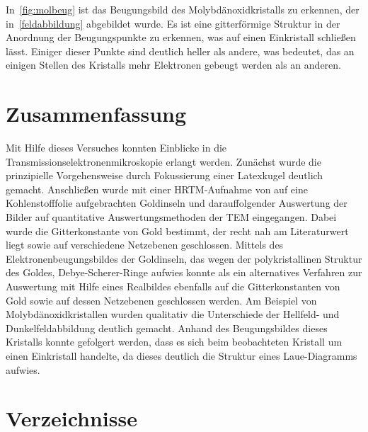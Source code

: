 \documentclass[slug=TEM, room=IFW, supervisor=?, coursedate=23.\ 01.\ 2020]{../../Lab_Report_LaTeX/lab_report}
\begin{document}
In~\ref{fig:molbeug} ist das Beugungsbild des Molybdänoxidkristalls zu erkennen, der
in~\ref{feldabbildung} abgebildet wurde. Es ist eine gitterförmige Struktur in der Anordnung der
Beugungspunkte zu erkennen, was auf einen Einkristall schließen lässt. Einiger dieser Punkte sind
deutlich heller als andere, was bedeutet, das an einigen Stellen des Kristalls mehr Elektronen
gebeugt werden als an anderen.

\section{Zusammenfassung}
\label{sec:zusfassung}

Mit Hilfe dieses Versuches konnten Einblicke in die Transmissionselektronenmikroskopie erlangt
werden. Zunächst wurde die prinzipielle Vorgehensweise durch Fokussierung einer Latexkugel
deutlich gemacht. Anschließen wurde mit einer HRTM-Aufnahme von auf eine Kohlenstofffolie
aufgebrachten Goldinseln und darauffolgender Auswertung der Bilder auf quantitative
Auswertungsmethoden der TEM eingegangen. Dabei wurde die Gitterkonstante von Gold bestimmt, der
recht nah am Literaturwert liegt sowie auf verschiedene Netzebenen geschlossen. Mittels des
Elektronenbeugungsbildes der Goldinseln, das wegen der polykristallinen Struktur des Goldes,
Debye-Scherer-Ringe aufwies konnte als ein alternatives Verfahren zur Auswertung mit Hilfe eines
Realbildes ebenfalls auf die Gitterkonstanten von Gold sowie auf dessen Netzebenen geschlossen
werden. Am Beispiel von Molybdänoxidkristallen wurden qualitativ die Unterschiede der Hellfeld-
und Dunkelfeldabbildung deutlich gemacht. Anhand des Beugungsbildes dieses Kristalls konnte
gefolgert werden, dass es sich beim beobachteten Kristall um einen Einkristall handelte, da
dieses deutlich die Struktur eines Laue-Diagramms aufwies. 

\newpage
\section{Verzeichnisse}
\label{sec:literatur}

\listoffigures

\listoftables

\printbibliography
\end{document}
